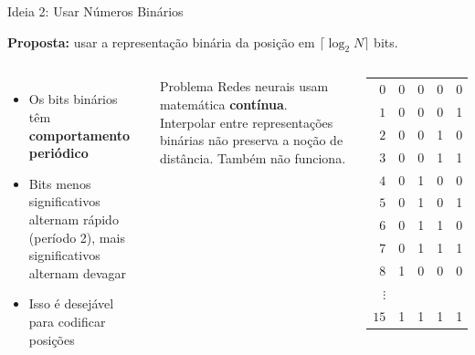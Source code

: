 \documentclass[aspectratio=169,xcolor=dvipsnames]{beamer}
\begin{document}

\begin{frame}{Ideia 2: Usar Números Binários}

\textbf{Proposta:} usar a representação binária da posição em $\lceil \log_2 N \rceil$ bits.

\vspace{4pt}

\begin{columns}[T]
\begin{itemize}
    \item Os bits binários têm \textbf{comportamento periódico}
    \item Bits menos significativos alternam rápido (período 2), mais significativos alternam devagar
    \item Isso é desejável para codificar posições
\end{itemize}

\vspace{6pt}

\begin{alertblock}{Problema}
Redes neurais usam matemática \textbf{contínua}. Interpolar entre representações binárias não preserva a noção de distância. Também não funciona.
\end{alertblock}

\centering
\footnotesize
\renewcommand{\arraystretch}{1.0}
\begin{tabular}{r|cccc}
$0$ & 0 & 0 & 0 & 0 \\
$1$ & 0 & 0 & 0 & 1 \\
$2$ & 0 & 0 & 1 & 0 \\
$3$ & 0 & 0 & 1 & 1 \\
$4$ & 0 & 1 & 0 & 0 \\
$5$ & 0 & 1 & 0 & 1 \\
$6$ & 0 & 1 & 1 & 0 \\
$7$ & 0 & 1 & 1 & 1 \\
$8$ & 1 & 0 & 0 & 0 \\
$\vdots$ &  &  &  &  \\
$15$ & 1 & 1 & 1 & 1 \\
\end{tabular}
\end{columns}

\end{frame}

\end{document}
